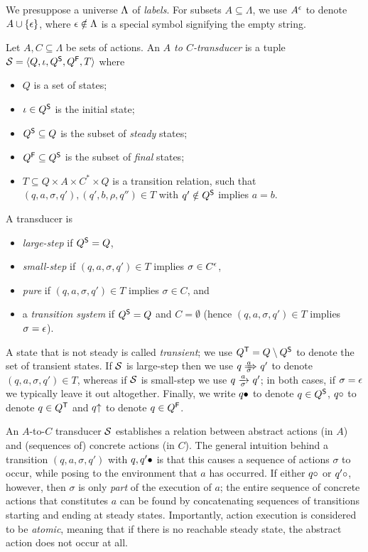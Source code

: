 \documentclass{llncs}
\begin{document}
We presuppose a universe $\Lambda$ of \emph{labels}. For subsets $A\subseteq \Lambda$, we use $A^\epsilon$ to denote $A\cup\{{\epsilon}\}$, where $\epsilon\notin\Lambda$ is a special symbol signifying the empty string.

\begin{definition}[transducer]
Let $A,C\subseteq \Lambda$ be sets of actions. An \emph{$A$ to $C$-transducer} is a tuple $\mathcal{S}=\langle{Q,\iota,Q^{\mathsf{S}},Q^{\mathsf{F}},T}\rangle$ where
\begin{itemize}[topsep=\itemsep]
\item $Q$ is a set of states;
\item $\iota\in Q^{\mathsf{S}}$ is the initial state;
\item $Q^{\mathsf{S}}\subseteq Q$ is the subset of \emph{steady} states;
\item $Q^{\mathsf{F}}\subseteq Q^{\mathsf{S}}$ is the subset of \emph{final} states;
\item $T\subseteq Q\times A\times C^*\times Q$ is a transition relation, such that $(q,a,\sigma,q'),(q',b,\rho,q'')\in T$ with $q'\notin Q^{\mathsf{S}}$ implies $a=b$.
\end{itemize}
A transducer is
\begin{itemize}
\item \emph{large-step} if $Q^{\mathsf{S}}=Q$,
\item \emph{small-step} if $(q,a,\sigma,q')\in T$ implies $\sigma\in C^\epsilon$,
\item \emph{pure} if $(q,a,\sigma,q')\in T$ implies $\sigma\in C$, and 
\item a \emph{transition system} if $Q^{\mathsf{S}}=Q$ and $C=\emptyset$ (hence $(q,a,\sigma,q')\in T$ implies $\sigma=\epsilon$).
\end{itemize}
\end{definition}
%
A state that is not steady is called \emph{transient}; we use $Q^{\mathsf{T}}=Q\setminus Q^{\mathsf{S}}$ to denote the set of transient states. If $\mathcal{S}$ is large-step then we use $q\Tduce a\sigma q'$ to denote $(q,a,\sigma,q')\in T$, whereas if $\mathcal{S}$ is small-step we use $q\tduce a\sigma q'$; in both cases, if $\sigma=\epsilon$ we typically leave it out altogether. Finally, we write $q{\bullet}$ to denote $q\in Q^{\mathsf{S}}$, $q{\circ}$ to denote $q\in Q^{\mathsf{T}}$ and $q{\uparrow}$ to denote $q\in Q^{\mathsf{F}}$.

An $A$-to-$C$ transducer $\mathcal{S}$ establishes a relation between abstract actions (in $A$) and (sequences of) concrete actions (in $C$). The general intuition behind a transition $(q,a,\sigma,q')$ with $q,q'{\bullet}$ is that this causes a sequence of actions $\sigma$ to occur, while posing to the environment that $a$ has occurred. If either $q{\circ}$ or $q'{\circ}$, however, then $\sigma$ is only \emph{part} of the execution of $a$; the entire sequence of concrete actions that constitutes $a$ can be found by concatenating sequences of transitions starting and ending at steady states. Importantly, action execution is considered to be \emph{atomic}, meaning that if there is no reachable steady state, the abstract action does not occur at all.
\end{document}
